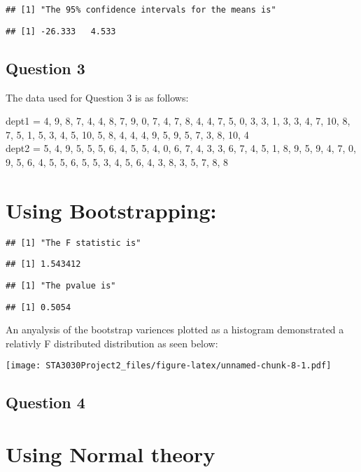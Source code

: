 \documentclass[]{article}
\begin{document}
\begin{verbatim}
## [1] "The 95% confidence intervals for the means is"
\end{verbatim}

\begin{verbatim}
## [1] -26.333   4.533
\end{verbatim}

\subsection{Question 3}\label{question-3}

The data used for Question 3 is as follows:

dept1 = 4, 9, 8, 7, 4, 4, 8, 7, 9, 0, 7, 4, 7, 8, 4, 4, 7, 5, 0, 3, 3,
1, 3, 3, 4, 7, 10, 8, 7, 5, 1, 5, 3, 4, 5, 10, 5, 8, 4, 4, 4, 9, 5, 9,
5, 7, 3, 8, 10, 4\\
dept2 = 5, 4, 9, 5, 5, 5, 6, 4, 5, 5, 4, 0, 6, 7, 4, 3, 3, 6, 7, 4, 5,
1, 8, 9, 5, 9, 4, 7, 0, 9, 5, 6, 4, 5, 5, 6, 5, 5, 3, 4, 5, 6, 4, 3, 8,
3, 5, 7, 8, 8

\section{Using Bootstrapping:}\label{using-bootstrapping}

\begin{verbatim}
## [1] "The F statistic is"
\end{verbatim}

\begin{verbatim}
## [1] 1.543412
\end{verbatim}

\begin{verbatim}
## [1] "The pvalue is"
\end{verbatim}

\begin{verbatim}
## [1] 0.5054
\end{verbatim}

An anyalysis of the bootstrap variences plotted as a histogram
demonstrated a relativly F distributed distribution as seen below:

\texttt{[image: STA3030Project2\_files/figure-latex/unnamed-chunk-8-1.pdf]}

\subsection{Question 4}\label{question-4}

\section{Using Normal theory}\label{using-normal-theory}
\end{document}
